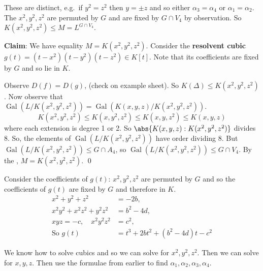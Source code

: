 \documentclass{article}
\DeclareMathOperator{\Gal}{Gal}
\begin{document}
These are distinct, e.g.\ if $y^2=z^2$ then $y=\pm z$ and so either $\alpha_3 = \alpha_4$ or $\alpha_1 = \alpha_2$.
The $x^2,y^2,z^2$ are permuted by $G$ and are fixed by $G \cap V_4$ by observation.
So $K(x^2, y^2, z^2) \leq M = L^{G \cap V_4}$.

\textbf{Claim}: We have equality $M=K(x^2, y^2, z^2)$.
Consider the \textbf{resolvent cubic} $g(t) = (t-x^2)(t-y^2)(t-z^2) \in K[t]$.
Note that its coefficients are fixed by $G$ and so lie in $K$.

Observe $D(f) = D(g)$, (check on example sheet).
So $K(\Delta) \leq K(x^2, y^2, z^2)$. Now observe that $\Gal(L/K(x^2, y^2, z^2)) = \Gal(K(x,y,z)/K(x^2,y^2,z^2))$.
\begin{equation*}
    K(x^2,y^2,z^2) \leq K(x,y^2,z^2)\leq K(x,y,z^2) \leq K(x,y,z)
\end{equation*}
where each extension is degree 1 or 2.
So $\abs{K(x,y,z):K(x^2,y^2,z^2)}$ divides 8.
So, the elements of $\Gal(L/K(x^2,y^2,z^2))$ have order dividing 8.
But $\Gal(L/K(x^2,y^2,z^2)) \leq G \cap A_4$, so $\Gal(L/K(x^2,y^2,z^2)) \leq G \cap V_4$.
By the , $M=K(x^2,y^2,z^2)$. \qed

Consider the coefficients of $g(t)$: $x^2,y^2,z^2$ are permuted by $G$ and so the coefficients of $g(t)$ are fixed by $G$ and therefore in $K$.
\begin{align*}
    x^2+y^2+z^2&=-2b,\\
    x^2y^2+x^2z^2+y^2z^2&=b^2-4d,\\
    xyz=-c, \quad x^2y^2z^2&=c^2,\\
    \text{So } g(t)&=t^3+2bt^2+(b^2-4d)t-c^2
\end{align*}

We know how to solve cubics and so we can solve for $x^2, y^2, z^2$. Then we can solve for $x,y,z$.
Then use the formulae from earlier to find $\alpha_1, \alpha_2,\alpha_3, \alpha_4$.
\begin{center}
\end{center}
\end{document}
